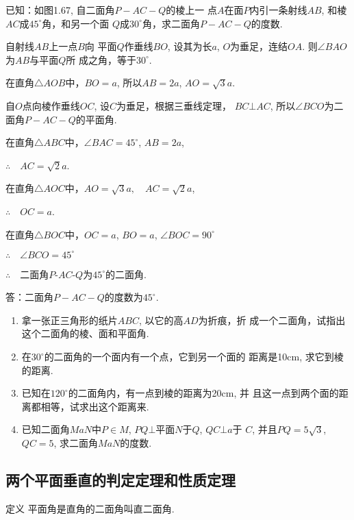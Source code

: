 \begin{example}
  已知：如图1.67, 自二面角$P-AC-Q$的棱上一
  点$A$在面$P$内引一条射线$AB$, 和棱$AC$成$45^{\circ}$角，和另一个面
  $Q$成$30^{\circ}$角，求二面角$P-AC-Q$的度数. 
\end{example}

\begin{solution}
    自射线$AB$上一点$B$向
平面$Q$作垂线$BO$, 设其为长$a$, 
$O$为垂足，连结$OA$.
则$\angle BAO$为$AB$与平面$Q$所
成之角，等于$30^{\circ}$.

在直角$\triangle AOB$中，$BO=a$, 
所以$AB=2a$, $AO=\sqrt{3}a$.

自$O$点向棱作垂线$OC$, 设$C$为垂足，根据三垂线定理，
$BC\bot AC$, 所以$\angle BCO$为二面角$P-AC-Q$的平面角. 

在直角$\triangle ABC$中，$\angle BAC=45^{\circ}$, $AB=2a$, 

$\therefore\quad AC=\sqrt{2}a$.

在直角$\triangle AOC$中，$AO=\sqrt{3}a,\quad AC=\sqrt{2}a$,

$\therefore\quad OC=a$.

在直角$\triangle BOC$中，$OC=a$, $BO=a$, $\angle BOC=90^{\circ}$

$\therefore\quad \angle BCO=45^{\circ}$

$\therefore\quad $二面角$P$-$AC$-$Q$为$45^{\circ}$的二面角.

答：二面角$P-AC-Q$的度数为$45^{\circ}$.
\end{solution}

\begin{ex}
\begin{enumerate}
  \item 拿一张正三角形的纸片$ABC$, 以它的高$AD$为折痕，折
  成一个二面角，试指出这个二面角的棱、面和平面角. 
  \item 在$30^{\circ}$的二面角的一个面内有一个点，它到另一个面的
  距离是10cm, 求它到棱的距离. 
  \item 已知在$120^{\circ}$的二面角内，有一点到棱的距离为20cm, 并
  且这一点到两个面的距离都相等，试求出这个距离来. 
  \item 已知二面角$MaN$中$P\in M$, $PQ\bot $平面$N$于$Q$, $QC\bot a$于
  $C$, 并且$PQ=5\sqrt{3}$, $QC=5$, 求二面角$MaN$的度数. 
\end{enumerate}
\end{ex}

\subsection{两个平面垂直的判定定理和性质定理}
\begin{blk}
  {定义} 平面角是直角的二面角叫直二面角. 
\end{blk}


